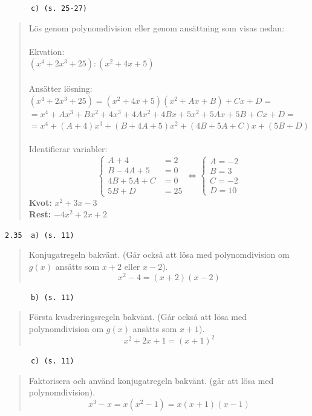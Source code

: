 \documentclass[a4paper]{article}
\newcommand{\tskcol}[1]{\textcolor{tskcol}{#1}}
\begin{document}
	\pagebreak
	\texttt{\tskcol{~~~~~~c) (s. 25-27)}}
	\begin{quotation}
		\noindent
		Lös genom polynomdivision eller genom ansättning som visas nedan: \\ \\
		Ekvation: \\
		$(x^4+2x^3+25):(x^2+4x+5)$ \\ \\
		Ansätter lösning: \\
		$(x^4+2x^3+25)=(x^2+4x+5)(x^2+Ax+B)+Cx+D=$ \\
		$=x^4+Ax^3+Bx^2+4x^3+4Ax^2+4Bx+5x^2+5Ax+5B+Cx+D=$ \\
		$=x^4+(A+4)x^3+(B+4A+5)x^2+(4B+5A+C)x+(5B+D)$ \\ \\
		Identifierar variabler:\\
		\[\begin{cases} 
		A+4&=2 \\ 
		B-4A+5&=0 \\ 
		4B+5A+C&=0 \\
		5B+D&=25
		\end{cases}
		\Leftrightarrow
		\begin{cases} 
		A=-2 \\ 
		B=3 \\
		C=-2 \\
		D=10
		\end{cases}\]
		\textbf{Kvot:} $x^2+3x-3$ \\
		\textbf{Rest:} $-4x^2+2x+2$
	\end{quotation}
	
	\texttt{\tskcol{2.35~~a) (s. 11)}}
	\begin{quotation}
		\noindent
		Konjugatregeln bakvänt. (Går också att lösa med polynomdivision om $g(x)$ ansätts som $x+2$ eller $x-2$).
		\[x^2-4=(x+2)(x-2)\]
	\end{quotation}
	
	\texttt{\tskcol{~~~~~~b) (s. 11)}}
	\begin{quotation}
		\noindent
		Första kvadreringsregeln bakvänt. (Går också att lösa med polynomdivision om $g(x)$ ansätts som $x+1$).
		\[x^2+2x+1=(x+1)^2\]
	\end{quotation}
	
	\texttt{\tskcol{~~~~~~c) (s. 11)}}
	\begin{quotation}
		\noindent
		Faktorisera och använd konjugatregeln bakvänt. (går att lösa med polynomdivision).
		\[x^3-x=x(x^2-1)=x(x+1)(x-1)\]
	\end{quotation}
	
\end{document}
